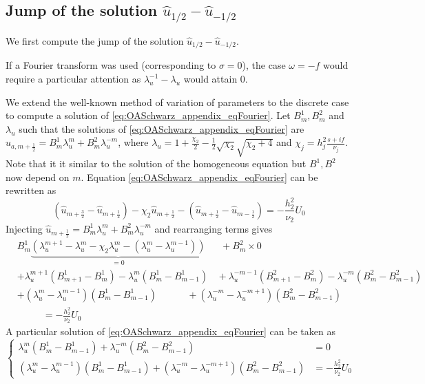 \subsection{Jump of the solution
	$\widehat{u}_{1/2} - \widehat{u}_{-1/2}$}
We first compute the jump of the solution
$\widehat{u}_{1/2} - \widehat{u}_{-1/2}$.
\begin{remark}
	If a Fourier transform was used
	(corresponding to $\sigma=0$), the case $\omega=-f$ would
	require a particular attention as
	$\lambda_u^{-1} - \lambda_u$ would attain 0.
\end{remark}
We extend the well-known method of variation of parameters to the
discrete case to compute a solution of
\eqref{eq:OASchwarz_appendix_eqFourier}.
Let $B_m^1, B_m^2$ and $\lambda_u$ such that
the solutions of \eqref{eq:OASchwarz_appendix_eqFourier} are
$\widehat{u}_{a,m+\frac{1}{2}} = B^1_m \lambda_u^m + B^2_m \lambda_u^{-m}$, where
$\lambda_u=1+\frac{\chi_2}{2}
-\frac{1}{2}\sqrt{\chi_2}\sqrt{\chi_2+4}$ and
$\chi_j = h_j^2 \frac{s + if}{\nu_j}$.
Note that it it similar to the solution of the homogeneous
equation but $B^1, B^2$ now depend on $m$.
	Equation \eqref{eq:OASchwarz_appendix_eqFourier}
	can be rewritten as
	\begin{equation}
		(\widehat{u}_{m+\frac{3}{2}} - \widehat{u}_{m+\frac{1}{2}})
		-\chi_2 \widehat{u}_{m+\frac{1}{2}}
		- (\widehat{u}_{m+\frac{1}{2}} - \widehat{u}_{m-\frac{1}{2}})
		= -\frac{h_2^2}{\nu_2} U_0
	\end{equation}
	Injecting $\widehat{u}_{m+\frac{1}{2}} = B^1_m \lambda_u^m +
	B^2_m \lambda_u^{-m}$ and rearranging terms gives
\begin{equation}
	\begin{aligned}
	&B^1_m \underbrace{\left(
		\lambda_u^{m+1} - \lambda_u^m - \chi_2 \lambda_u^m
		- (\lambda_u^{m} - \lambda_u^{m-1})
		\right)}_{=0} ~~~~~~~+ B^2_m \times 0 \\
	&+ \lambda_u^{m+1} (B_{m+1}^1 - B_m^1)
		- \lambda_u^{m} (B_{m}^1 - B_{m-1}^1)
		~~~~+ \lambda_u^{-m-1} (B_{m+1}^2 - B_m^2)
		- \lambda_u^{-m} (B_{m}^2 - B_{m-1}^2)
		\\
	&+ (\lambda_u^m - \lambda_u^{m-1})(B_{m}^1 - B_{m-1}^1)
		~~~~~~~~~~~~~~+ (\lambda_u^{-m} - \lambda_u^{-m+1})
				(B_{m}^2 - B_{m-1}^2)\\
		&~~~~~~~~~~~~= -\frac{h_2^2}{\nu_2}U_0
	\end{aligned}
\end{equation}
A particular solution of \eqref{eq:OASchwarz_appendix_eqFourier}
can be taken as
\begin{equation}
\begin{cases}
	\lambda_u^m(B_m^1 - B_{m-1}^1)
	+ \lambda_u^{-m}(B_m^2 - B_{m-1}^2)&= 0 \\
	(\lambda_u^m - \lambda_u^{m-1})(B_m^1 - B_{m-1}^1)
	+ (\lambda_u^{-m} - \lambda_u^{-m+1})(B_m^2 - B_{m-1}^2)
	&= -\frac{h_2^2}{\nu_2}{U_0}
\end{cases}
\end{equation}
